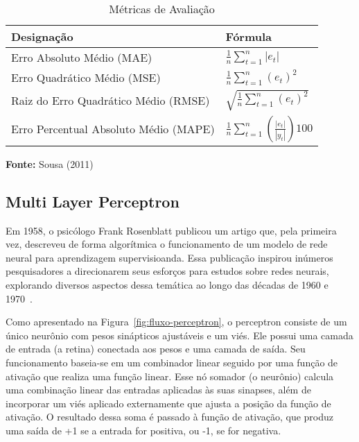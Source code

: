             \begin{center}
                \begin{table}[h!]
                    \centering
                    \caption{Métricas de Avaliação}
                    \label{tab:calculo_erros}
                    \begin{tabular}{ll}
                        \toprule
                        \textbf{Designação} & \textbf{Fórmula} \\ 
                        \midrule
                        Erro Absoluto Médio (MAE) & $\frac{1}{n} \sum_{t=1}^{n} |e_t|$ \\[8pt]
                        Erro Quadrático Médio (MSE) & $\frac{1}{n} \sum_{t=1}^{n} (e_t)^2$ \\[8pt]
                        Raiz do Erro Quadrático Médio (RMSE) & $\sqrt{\frac{1}{n} \sum_{t=1}^{n} (e_t)^2}$ \\[8pt]
                        Erro Percentual Absoluto Médio (MAPE) & $\frac{1}{n} \sum_{t=1}^{n} \left(\frac{|e_t|}{|y_t|}\right) 100$ \\ 
                        \bottomrule
                    \end{tabular}
                    
                    \bigskip
                    \small \textbf{Fonte:} Sousa (2011)
                    \label{fig:tabela-metricas}
                \end{table}
            \end{center}
            
            
    \subsection{Multi Layer Perceptron}
    
        Em 1958, o psicólogo Frank Rosenblatt publicou um artigo que, pela primeira vez, descreveu de forma 
        algorítmica o funcionamento de um modelo de rede neural para aprendizagem supervisioanda. Essa 
        publicação inspirou inúmeros pesquisadores a direcionarem seus esforços para estudos sobre redes neurais, 
        explorando diversos aspectos dessa temática ao longo das décadas de 1960 e 1970~\cite{haykin2009neural}.

        Como apresentado na Figura~\ref{fig:fluxo-perceptron}, o perceptron consiste de um único neurônio com 
        pesos sinápticos ajustáveis e um viés. Ele possui uma camada de entrada (a retina) conectada aos pesos e 
        uma camada de saída. Seu funcionamento baseia-se em um combinador linear seguido por uma função de 
        ativação que realiza uma função linear. Esse nó somador (o neurônio) calcula uma combinação linear das 
        entradas aplicadas às suas sinapses, além de incorporar um viés aplicado externamente que ajusta a posição
        da função de ativação. O resultado dessa soma é passado à função de ativação, que produz uma saída de +1 
        se a entrada for positiva, ou -1, se for negativa. 
        
